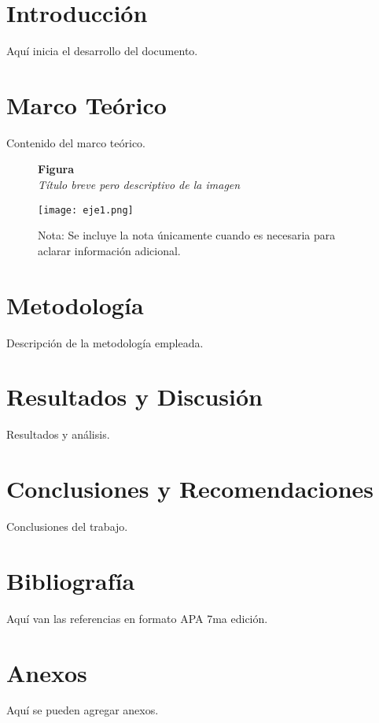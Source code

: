 \documentclass[12pt,letterpaper]{report}
\begin{document}
	\caratulaTapa
	\caratulaContenido
	
	\configurarIndices
    \tableofcontents
    \thispagestyle{empty}
    \newpage
    \listoffigures
    \thispagestyle{empty}
    \newpage
    \listoftables
    \thispagestyle{empty}
    \newpage
	

	\iniciarNumeracion
	\chapter{Introducción}
	Aquí inicia el desarrollo del documento.
	
	\chapter{Marco Teórico}
	Contenido del marco teórico.
	\begin{figure}[ht]
    
    \textbf{Figura \thefigure}\\[0.5em]
    \textit{Título breve pero descriptivo de la imagen}\\[1em]
    \begin{center}
    
    \texttt{[image: eje1.png]}\\[1em]
    \end{center}
    
    
    \normalsize Nota: Se incluye la nota únicamente cuando es necesaria para aclarar información adicional.

\end{figure}
	
	\chapter{Metodología}
	Descripción de la metodología empleada.
	
	\chapter{Resultados y Discusión}
	Resultados y análisis.
	
	\chapter{Conclusiones y Recomendaciones}
	Conclusiones del trabajo.
	
	\chapter*{Bibliografía}
	Aquí van las referencias en formato APA 7ma edición.
	
	\chapter*{Anexos}
	Aquí se pueden agregar anexos.
	
\end{document}
